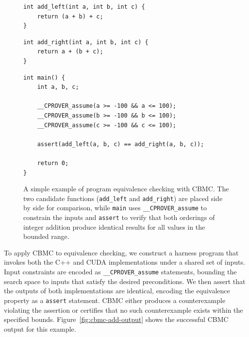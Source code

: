 \documentclass{article}
\begin{document}
\begin{figure}[h]
\begin{minipage}[t]{0.48\linewidth}
\begin{verbatim}
int add_left(int a, int b, int c) {
    return (a + b) + c;
}
\end{verbatim}
\end{minipage}
\hfill
\begin{minipage}[t]{0.48\linewidth}
\begin{verbatim}
int add_right(int a, int b, int c) {
    return a + (b + c);
}
\end{verbatim}
\end{minipage}

\medskip

\begin{verbatim}
int main() {
    int a, b, c;

    __CPROVER_assume(a >= -100 && a <= 100);
    __CPROVER_assume(b >= -100 && b <= 100);
    __CPROVER_assume(c >= -100 && c <= 100);

    assert(add_left(a, b, c) == add_right(a, b, c));

    return 0;
}
\end{verbatim}
\caption{A simple example of program equivalence checking with CBMC. The two candidate functions (\texttt{add\_left} and \texttt{add\_right}) are placed side by side for comparison, while \texttt{main} uses \texttt{\_\_CPROVER\_assume} to constrain the inputs and \texttt{assert} to verify that both orderings of integer addition produce identical results for all values in the bounded range.}
\label{fig:cbmc-add-equiv}
\end{figure}

To apply CBMC to equivalence checking, we construct a harness program that invokes both the C++ and CUDA implementations under a shared set of inputs. Input constraints are encoded as \texttt{\_\_CPROVER\_assume} statements, bounding the search space to inputs that satisfy the desired preconditions. We then assert that the outputs of both implementations are identical, encoding the equivalence property as a \texttt{assert} statement. CBMC either produces a counterexample violating the assertion or certifies that no such counterexample exists within the specified bounds. Figure~\ref{fig:cbmc-add-output} shows the successful CBMC output for this example.
\end{document}
